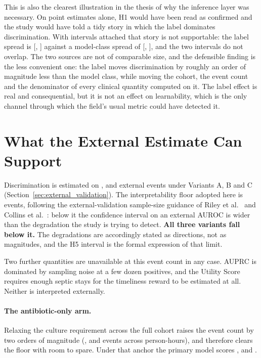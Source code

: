 This is also the clearest illustration in the thesis of why the inference layer
was necessary. On point estimates alone, H1 would have been read as confirmed
and the study would have told a tidy story in which the label dominates
discrimination. With intervals attached that story is not supportable: the
label spread is \pcSpreadLabel{} [\pcSpreadLabelCiLo, \pcSpreadLabelCiHi]
against a model-class spread of \pcSpreadModelClass{}
[\pcSpreadModelClassCiLo, \pcSpreadModelClassCiHi], and the two intervals do
not overlap. The two sources are not of comparable size, and the defensible
finding is the less convenient one: the label moves discrimination by roughly
an order of magnitude less than the model class, while moving the cohort, the
event count and the denominator of every clinical quantity computed on it. The
label effect is real and consequential, but it is not an effect on
learnability, which is the only channel through which the field's usual metric
could have detected it.


\section{What the External Estimate Can Support}
\label{sec:external_interpretability}

Discrimination is estimated on \pcExtNEventsA{}, \pcExtNEventsB{} and
\pcExtNEventsC{} external events under Variants A, B and C
(Section~\ref{sec:external_validation}). The interpretability floor adopted
here is \pcExtMinEvents{} events, following the external-validation sample-size
guidance of Riley et al.\ \cite{riley2019sample} and Collins et al.\
\cite{collins2024tripodai}: below it the confidence interval on an external
AUROC is wider than the degradation the study is trying to detect.
\textbf{All three variants fall below it.} The degradations are accordingly
stated as directions, not as magnitudes, and the H5 interval is the formal
expression of that limit.

Two further quantities are unavailable at this event count in any case. AUPRC is
dominated by sampling noise at a few dozen positives, and the Utility Score
requires enough septic stays for the timeliness reward to be estimated at all.
Neither is interpreted externally.

\paragraph{The antibiotic-only arm.} Relaxing the culture requirement across
the full cohort raises the event count by two orders of magnitude (\pcExtAbxNEventsA, \pcExtAbxNEventsB{} and \pcExtAbxNEventsC{} events across
\pcExtAbxNRows{} person-hours), and therefore clears the floor with room to
spare. Under that anchor the primary model scores \pcExtAbxAurocPrimaryA,
\pcExtAbxAurocPrimaryB{} and \pcExtAbxAurocPrimaryC.

